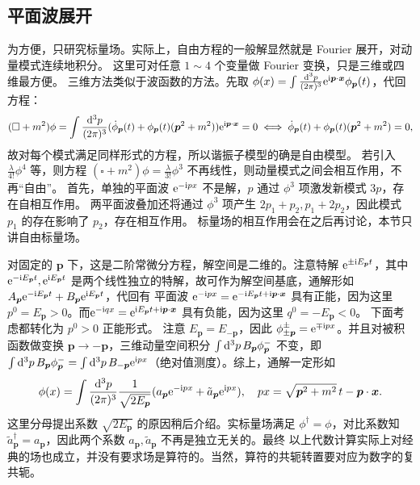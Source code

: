 \subsection{平面波展开}

为方便，只研究标量场。实际上，自由方程的一般解显然就是 Fourier 展开，对动量模式连续地积分。
这里可对任意 $1\sim 4$ 个变量做 Fourier 变换，只是三维或四维最方便。
三维方法类似于波函数的方法。先取 $\phi(x) = \int\frac{\dd[3]p}{(2\pi)^3}\mathrm{e}^{\mathrm{i} \bm p\cdot\bm x}\phi_{\bm p}(t)$，代回方程：
\[(\square+m^2)\phi = \int\frac{\dd[3]p}{(2\pi)^3}(\dot\phi_{\bm p}(t) + \phi_{\bm p}(t) (\bm p^2 + m^2) )\mathrm{e}^{\mathrm{i}\bm p\cdot\bm x} = 0 \iff \dot\phi_{\bm p}(t) + \phi_{\bm p}(t) (\bm p^2 + m^2) = 0,\]
故对每个模式满足同样形式的方程，所以谐振子模型的确是自由模型。
若引入 $\frac{\lambda}{4!}\phi^4$ 等，则方程 $(\square+m^2)\phi = \frac{\lambda}{3!}\phi^3$ 不再线性，则动量模式之间会相互作用，不再“自由”。
首先，单独的平面波 $\mathrm{e}^{-\mathrm{i} px}$ 不是解，$p$ 通过 $\phi^3$ 项激发新模式 $3p$，存在自相互作用。
两平面波叠加还将通过 $\phi^3$ 项产生 $2p_1+p_2,p_1+2p_2$，因此模式 $p_1$ 的存在影响了 $p_2$，存在相互作用。
标量场的相互作用会在之后再讨论，本节只讲自由标量场。


对固定的 $\bm p$ 下，这是二阶常微分方程，解空间是二维的。注意特解 $\mathrm{e}^{\pm\mathrm{i} E_{\bm p} t}$，其中
$\mathrm{e}^{-\mathrm{i} E_{\bm p} t},\mathrm{e}^{\mathrm{i} E_{\bm p} t}$ 是两个线性独立的特解，故可作为解空间基底，通解形如 $A_{\bm p} \mathrm{e}^{-\mathrm{i} E_{\bm p} t} + B_{\bm p} \mathrm{e}^{\mathrm{i} E_{\bm p} t}$，代回有
平面波 $\mathrm{e}^{-\mathrm{i} px}=\mathrm{e}^{-\mathrm{i} E_{\bm p}t + \mathrm{i}\bm p\cdot\bm x}$ 具有正能，因为这里 $p^0=E_{\bm p}>0$。而$\mathrm{e}^{-\mathrm{i} qx}=\mathrm{e}^{\mathrm{i} E_{\bm p}t + \mathrm{i}\bm p\cdot\bm x}$ 具有负能，因为这里 $q^0=-E_{\bm p}<0$。
下面考虑都转化为 $p^0>0$ 正能形式。
注意 $E_{\bm p}=E_{-\bm p}$，因此 $\phi^\pm_{\pm\bm p}=\mathrm{e}^{\mp\mathrm{i} px}$。并且对被积函数做变换 $\bm p\to-\bm p$，三维动量空间积分 $\int \dd[3]{p} B_{\bm p}\phi^-_{\bm p}$ 不变，即 $\int \dd[3]{p} B_{\bm p}\phi^-_{\bm p} = \int \dd[3]{p} B_{-\bm p}\mathrm{e}^{\mathrm{i} px}$（绝对值测度）。综上，通解一定形如
\[
    \phi(x) = \int\frac{\dd[3]p}{(2\pi)^3}\frac{1}{\sqrt{2E_{\bm p}}} (a_{\bm p} \mathrm{e}^{-\mathrm{i} px} + \tilde a_{\bm p} \mathrm{e}^{\mathrm{i} px} ),\quad px = \sqrt{\bm p^2+m^2}\, t - \bm p\cdot \bm x.
\]
这里分母提出系数 $\sqrt{2E_{\bm p}}$ 的原因稍后介绍。实标量场满足 $\phi^\dagger=\phi$，对比系数知 $\tilde a^\dagger_{\bm p}=a_{\bm p}$，因此两个系数 $a_{\bm p},\tilde a_{\bm p}$ 不再是独立无关的。最终
以上代数计算实际上对经典的场也成立，并没有要求场是算符的。当然，算符的共轭转置要对应为数字的复共轭。

